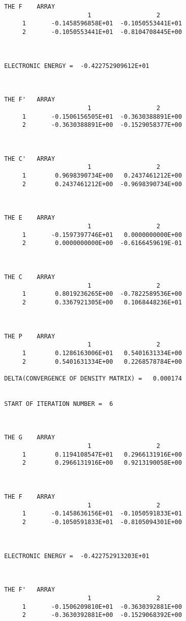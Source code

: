 \begin{verbatim}
 THE F    ARRAY
                        1                  2
      1       -0.1458596858E+01  -0.1050553441E+01
      2       -0.1050553441E+01  -0.8104708445E+00



 ELECTRONIC ENERGY =  -0.422752909612E+01



 THE F'   ARRAY
                        1                  2
      1       -0.1506156505E+01  -0.3630388891E+00
      2       -0.3630388891E+00  -0.1529058377E+00



 THE C'   ARRAY
                        1                  2
      1        0.9698390734E+00   0.2437461212E+00
      2        0.2437461212E+00  -0.9698390734E+00



 THE E    ARRAY
                        1                  2
      1       -0.1597397746E+01   0.0000000000E+00
      2        0.0000000000E+00  -0.6166459619E-01



 THE C    ARRAY
                        1                  2
      1        0.8019236265E+00  -0.7822589536E+00
      2        0.3367921305E+00   0.1068448236E+01



 THE P    ARRAY
                        1                  2
      1        0.1286163006E+01   0.5401631334E+00
      2        0.5401631334E+00   0.2268578784E+00

 DELTA(CONVERGENCE OF DENSITY MATRIX) =   0.000174


 START OF ITERATION NUMBER =  6



 THE G    ARRAY
                        1                  2
      1        0.1194108547E+01   0.2966131916E+00
      2        0.2966131916E+00   0.9213190058E+00



 THE F    ARRAY
                        1                  2
      1       -0.1458636156E+01  -0.1050591833E+01
      2       -0.1050591833E+01  -0.8105094301E+00



 ELECTRONIC ENERGY =  -0.422752913203E+01



 THE F'   ARRAY
                        1                  2
      1       -0.1506209810E+01  -0.3630392881E+00
      2       -0.3630392881E+00  -0.1529068392E+00




\end{verbatim}
